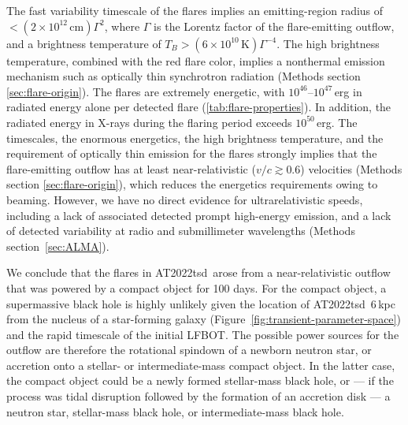 \documentclass{nature_plusfigure}
\newcommand{\at}{AT2022tsd}
\begin{document}
The fast variability timescale of the flares implies an emitting-region radius of $<(2\times10^{12}\,\mathrm{cm}) \Gamma^2$, where $\Gamma$ is the Lorentz factor of the flare-emitting outflow,
and a brightness temperature of $T_B>(6\times10^{10}\,\mathrm{K})\Gamma^{-4}$.
The high brightness temperature, combined with the red flare color, implies a nonthermal emission mechanism such as optically thin synchrotron radiation (Methods section \ref{sec:flare-origin}).
The flares are extremely energetic, with $10^{46}$--$10^{47}$\,erg in radiated energy alone per detected flare (\ref{tab:flare-properties}).
In addition, the radiated energy in X-rays during the flaring period exceeds $10^{50}$\,erg.
The timescales, the enormous energetics, the high brightness temperature, and the requirement of optically thin emission for the flares strongly implies that the flare-emitting outflow has at least near-relativistic ($v/c\gtrsim0.6$) velocities (Methods section \ref{sec:flare-origin}),
which reduces the energetics requirements owing to beaming.
However, we have no direct evidence for ultrarelativistic speeds, including a lack of associated detected prompt high-energy emission,
and a lack of detected variability at radio and submillimeter wavelengths (Methods section~\ref{sec:ALMA}).

We conclude that the flares in \at\ arose from a near-relativistic outflow that was powered by a compact object for 100 days. For the compact object, a supermassive black hole is highly unlikely given the location of \at\ 6\,kpc from the nucleus of a star-forming galaxy (Figure~\ref{fig:transient-parameter-space}) and the rapid timescale of the initial LFBOT. The possible power sources for the outflow are therefore the rotational spindown of a newborn neutron star, or accretion onto a stellar- or intermediate-mass compact object. In the latter case, the compact object could be a newly formed stellar-mass black hole, or --- if the process was tidal disruption followed by the formation of an accretion disk --- a neutron star, stellar-mass black hole, or intermediate-mass black hole. 
\end{document}
